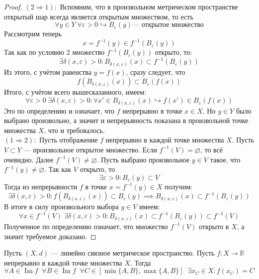 \documentclass[11pt]{article}
\DeclareMathOperator{\Imm}{Im}
\begin{document}
\begin{proof}
    $(2 \Longrightarrow 1):$ Вспомним, что в произвольном метрическом пространстве открытый 
    шар всегда является открытым множеством, то есть
    \[\forall y \in Y \; \forall \varepsilon > 0 \hookrightarrow B_{\varepsilon}(y) \text{--- открытое множество}\]
    Рассмотрим теперь
    \[x = f^{-1}(y) \in f^{-1}(B_{\varepsilon}(y))\]
    Так как по условию $2$ множество $f^{-1}(B_{\varepsilon}(y))$ открыто, то:
    \[\exists \delta(x, \varepsilon) > 0: B_{\delta(x, \varepsilon)}(x) \subset f^{-1}(B_{\varepsilon}(y))\]
    Из этого, с учётом равенства $y = f(x)$, сразу следует, что 
    \[f(B_{\delta(x, \varepsilon)}(x)) \subset B_{\varepsilon}(f(x))\]
    Итого, с учётом всего вышесказанного, имеем:
    \[\forall \varepsilon > 0 \; \exists \delta(x, \varepsilon) > 0: \forall x' \in B_{\delta(x, \varepsilon)}(x) \hookrightarrow f(x') \in B_{\varepsilon}(f(x))\]
    Это по определению и означает, что $f$ непрерывно в точке $x \in X$. Но $y \in Y$ было выбрано 
    произвольно, а значит и непрерывность показана в произвольной точке множества $X$, что и требовалось.
    \\
    $(1 \Longrightarrow 2):$ Пусть отображение $f$ непрерывно в каждой точке множества $X$. Пусть $V \subset Y$ --- 
    произвольное открытое множество. Если $f^{-1}(V) = \varnothing$, то всё очевидно. Далее $f^{-1}(V) \neq \varnothing$. 
    Пусть выбрано произвольное $y \in V$ такое, что $f^{-1}(y) \neq \varnothing$. Так как $V$ открыто, то 
    \[\exists \varepsilon > 0: B_{\varepsilon}(y) \subset V\]
    Тогда из непрерывности $f$ в точке $x = f^{-1}(y) \in X$ получим:
    \[\exists \delta(x, \varepsilon) > 0: f(B_{\delta(x, \varepsilon)}(x)) \subset B_{\varepsilon}(y) \implies B_{\delta(x, \varepsilon)}(x) \subset f^{-1}(B_{\varepsilon}(y))\]
    В итоге в силу произвольного выбора $y \in V$ имеем:
    \[\forall x \in f^{-1}(V) \; \exists \delta(x, \varepsilon) > 0: B_{\delta(x, \varepsilon)}(x) \subset f^{-1}(B_{\varepsilon}(y)) \subset f^{-1}(V)\]
    Полученное по определению означает, что множество $f^{-1}(V)$ открыто в $X$, а значит требуемое доказано.
\end{proof}

\begin{theorem}
    Пусть $(X, d)$ --- линейно связное метрическое пространство. Пусть $f \colon X \to \mathbb{R}$ непрерывно в 
    каждой точке множества $X$. Тогда 
    \[\forall A \in \Imm f \; \; \forall B \in \Imm f \; \; \forall C \in [\min \{A, B\}, \max \{A, B\}] \; \; \exists x_C \in X: f(x_C) = C\]
\end{theorem}
\end{document}
